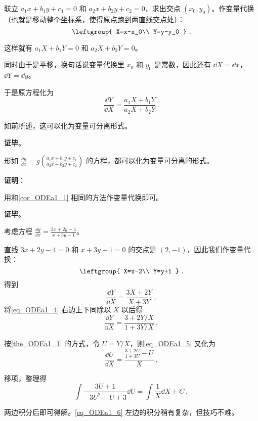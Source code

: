 联立 $a_1x+b_1y+c_1=0$ 和 $a_2x+b_2y+c_2=0$，求出交点 $(x_0, y_0)$。作变量代换（也就是移动整个坐标系，使得原点跑到两直线交点处）：
\begin{equation}
\leftgroup{
    X=x-x_0\\
    Y=y-y_0
}~,
\end{equation}

这样就有 $a_1X+b_1Y=0$ 和 $a_2X+b_2Y=0$。

同时由于是平移，换句话说变量代换里 $x_0$ 和 $y_0$ 是常数，因此还有 $\dd X=\dd x$，$\dd Y=\dd y$。

于是原方程化为
\begin{equation}
\frac{\dd Y}{\dd X}=\frac{a_1X+b_1Y}{a_2X+b_2Y}~.
\end{equation}

如前所述，这可以化为变量可分离形式。

\textbf{证毕}。

\begin{corollary}{}
形如 $\frac{\dd y}{\dd x}=g(\frac{a_1x+b_1y+c_1}{a_2x+b_2y+c_2})$ 的方程，都可以化为变量可分离的形式。
\end{corollary}

\textbf{证明}：

用和\autoref{cor_ODEa1_1} 相同的方法作变量代换即可。

\textbf{证毕}。





\begin{example}{}
考虑方程 $\frac{\dd y}{\dd x}=\frac{3x+2y-4}{x+3y+1}$。

直线 $3x+2y-4=0$ 和 $x+3y+1=0$ 的交点是 $(2, -1)$，因此我们作变量代换：
\begin{equation}
\leftgroup{
    X=x-2\\
    Y=y+1
}~.
\end{equation}
得到
\begin{equation}\label{eq_ODEa1_4}
\frac{\dd Y}{\dd X}=\frac{3X+2Y}{X+3Y}~,
\end{equation}
将\autoref{eq_ODEa1_4} 右边上下同除以 $X$ 以后得
\begin{equation}\label{eq_ODEa1_5}
\frac{\dd Y}{\dd X}=\frac{3+2Y/X}{1+3Y/X}~,
\end{equation}

按\autoref{the_ODEa1_1} 的方式，令 $U=Y/X$，则\autoref{eq_ODEa1_5} 又化为
\begin{equation}
\frac{\dd U}{\dd X}=\frac{\frac{3+2U}{1+3U}-U}{X}~,
\end{equation}

移项，整理得
\begin{equation}\label{eq_ODEa1_6}
\int\frac{3U+1}{-3U^2+U+3}\dd U=\int\frac{1}{X}\dd X+C~,
\end{equation}

两边积分后即可得解。\autoref{eq_ODEa1_6} 左边的积分稍有复杂，但技巧不难。

\end{example}








